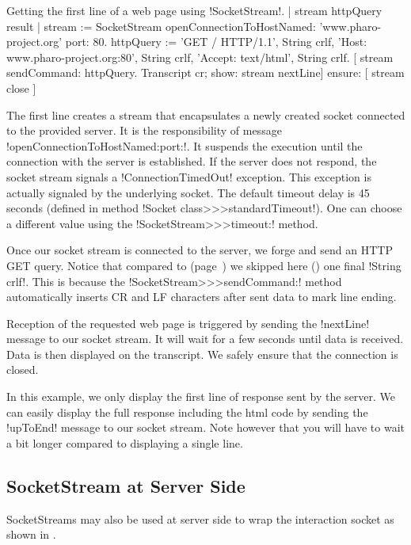 \documentclass[a4paper,10pt,twoside]{book}
\begin{document}
\begin{script}{Getting the first line of a web page using \ct!SocketStream!.}
	| stream httpQuery result |
	stream := SocketStream 
			openConnectionToHostNamed: 'www.pharo-project.org' 
			port: 80.
	httpQuery := 'GET / HTTP/1.1', String crlf, 
		'Host: www.pharo-project.org:80', String crlf, 
		'Accept: text/html', String crlf.
	[ stream sendCommand: httpQuery.
	Transcript cr; show: stream nextLine] ensure: [ stream close ]
\end{script}

The first line creates a stream that encapsulates a newly created socket connected to the provided server.
It is the responsibility of message \ct!openConnectionToHostNamed:port:!.
It suspends the execution until the connection with the server is established.
If the server does not respond, the socket stream signals a \ct!ConnectionTimedOut! exception.
This exception is actually signaled by the underlying socket.
The default timeout delay is 45 seconds (defined in method \ct!Socket class>>>standardTimeout!).
One can choose a different value using the \ct!SocketStream>>>timeout:! method.

Once our socket stream is connected to the server, we forge and send an HTTP GET query.
Notice that compared to  (page~\pageref{scr:script:closeAndDestroy}) we skipped here () one final \ct!String crlf!.
This is because the \ct!SocketStream>>>sendCommand:! method automatically inserts CR and LF characters after sent data to mark line ending.

Reception of the requested web page is triggered by sending the \ct!nextLine! message to our socket stream.
It will wait for a few seconds until data is received.
Data is then displayed on the transcript.
We safely ensure that the connection is closed.

In this example, we only display the first line of response sent by the server.
We can easily display the full response including the html code by sending the \ct!upToEnd! message to our socket stream.
Note however that you will have to wait a bit longer compared to displaying a single line.

\subsection{SocketStream at Server Side}
SocketStreams may also be used at server side to wrap the interaction socket as shown in .
\end{document}
